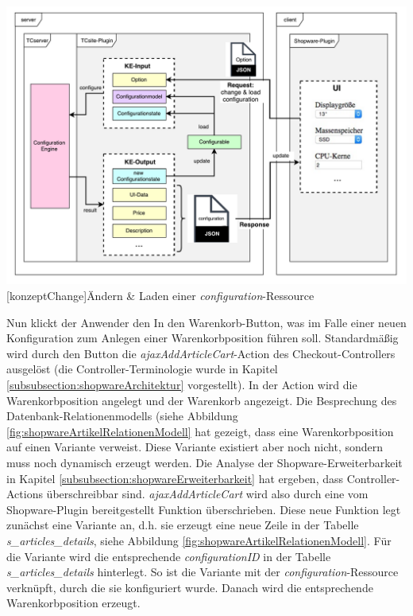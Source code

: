 \documentclass[12pt,a4paper,bibliography=totocnumbered,listof=totoc]{scrartcl}
\begin{document}
\vspace{1em}
\begin{minipage}{\linewidth}
	\centering
	\includegraphics[width=1\linewidth]{Abbildungen/konzeptChange.pdf}
	[konzeptChange]{Ändern \& Laden einer \emph{configuration}-Ressource}
	\label{fig:konzeptChange}
\end{minipage}
\vspace{1em}

Nun klickt der Anwender den \glqq In den Warenkorb\grqq{}-Button, was im Falle einer neuen Konfiguration zum Anlegen einer Warenkorbposition führen soll. Standardmäßig wird durch den Button die \emph{ajaxAddArticleCart}-Action des Checkout-Controllers ausgelöst (die Controller-Terminologie wurde in Kapitel \ref{subsubsection:shopwareArchitektur} vorgestellt). In der Action wird die Warenkorbposition angelegt und der Warenkorb angezeigt. Die Besprechung des Datenbank-Relationenmodells (siehe Abbildung \ref{fig:shopwareArtikelRelationenModell} hat gezeigt, dass eine Warenkorbposition auf einen Variante verweist. Diese Variante existiert aber noch nicht, sondern muss noch dynamisch erzeugt werden. Die Analyse der Shopware-Erweiterbarkeit in Kapitel \ref{subsubsection:shopwareErweiterbarkeit} hat ergeben, dass Controller-Actions überschreibbar sind. \emph{ajaxAddArticleCart} wird also durch eine vom Shopware-Plugin bereitgestellt Funktion überschrieben. Diese neue Funktion legt zunächst eine Variante an, d.h. sie erzeugt eine neue Zeile in der Tabelle \emph{s\_articles\_details}, siehe Abbildung \ref{fig:shopwareArtikelRelationenModell}. Für die Variante wird die entsprechende \emph{configurationID} in der Tabelle \emph{s\_articles\_details} hinterlegt. So ist die Variante mit der \emph{configuration}-Ressource verknüpft, durch die sie konfiguriert wurde. Danach wird die entsprechende Warenkorbposition erzeugt.
\end{document}
